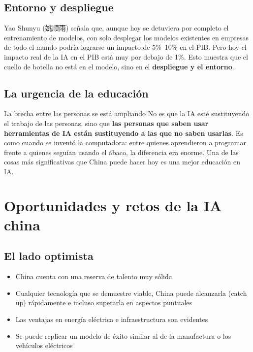 \documentclass[a4paper]{article}
\begin{document}
\subsection{Entorno y despliegue}

Yao Shunyu (姚顺雨) señala que, aunque hoy se detuviera por completo el entrenamiento de modelos, con solo desplegar los modelos existentes en empresas de todo el mundo podría lograrse un impacto de 5\%--10\% en el PIB. Pero hoy el impacto real de la IA en el PIB está muy por debajo de 1\%. Esto muestra que el cuello de botella no está en el modelo, sino en el \textbf{despliegue y el entorno}.

\subsection{La urgencia de la educación}

\begin{importantbox}{La brecha entre las personas se está ampliando}
No es que la IA esté sustituyendo el trabajo de las personas, sino que \textbf{las personas que saben usar herramientas de IA están sustituyendo a las que no saben usarlas}. Es como cuando se inventó la computadora: entre quienes aprendieron a programar frente a quienes seguían usando el ábaco, la diferencia era enorme. Una de las cosas más significativas que China puede hacer hoy es una mejor educación en IA.
\end{importantbox}

\section{Oportunidades y retos de la IA china}

\subsection{El lado optimista}

\begin{itemize}
\item China cuenta con una reserva de talento muy sólida
\item Cualquier tecnología que se demuestre viable, China puede alcanzarla (catch up) rápidamente e incluso superarla en aspectos puntuales
\item Las ventajas en energía eléctrica e infraestructura son evidentes
\item Se puede replicar un modelo de éxito similar al de la manufactura o los vehículos eléctricos
\end{itemize}
\end{document}
